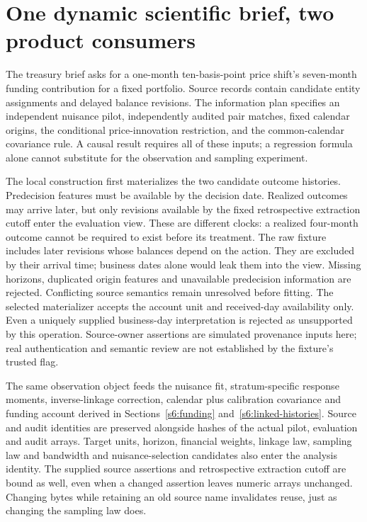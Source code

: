 \section{One dynamic scientific brief, two product consumers}
\label{s6:composition}
The treasury brief asks for a one-month ten-basis-point price shift's
seven-month funding contribution for a fixed portfolio. Source records
contain candidate entity assignments and delayed balance revisions.
The information plan specifies an independent nuisance pilot, independently
audited pair matches, fixed calendar origins, the conditional price-innovation
restriction, and the common-calendar covariance rule. A causal result
requires all of these inputs; a regression formula alone cannot substitute
for the observation and sampling experiment.

The local construction first materializes the two candidate outcome
histories. Predecision features must be available by the decision date.
Realized outcomes may arrive later, but only revisions available by the
fixed retrospective extraction cutoff enter the evaluation view. These
are different clocks: a realized four-month outcome cannot be required to
exist before its treatment. The raw fixture includes later revisions whose
balances depend on the action. They are excluded by their arrival time;
business dates alone would leak them into the view. Missing horizons,
duplicated origin features and unavailable predecision information are
rejected. Conflicting source semantics remain unresolved before fitting.
The selected materializer accepts the account unit and received-day
availability only. Even a uniquely supplied business-day interpretation is
rejected as unsupported by this operation. Source-owner assertions are
simulated provenance inputs here; real authentication and semantic review
are not established by the fixture's trusted flag.

The same observation object feeds the nuisance fit, stratum-specific response
moments, inverse-linkage correction, calendar plus calibration covariance
and funding account derived in Sections~\ref{s6:funding}
and~\ref{s6:linked-histories}. Source and audit identities are preserved
alongside hashes of the actual pilot, evaluation and audit arrays. Target
units, horizon, financial weights, linkage law, sampling law and bandwidth
and nuisance-selection candidates also enter the analysis identity. The
supplied source assertions and retrospective extraction cutoff are bound
as well, even when a changed assertion leaves numeric arrays unchanged.
Changing bytes while retaining an old
source name invalidates reuse, just as changing the sampling law does.

